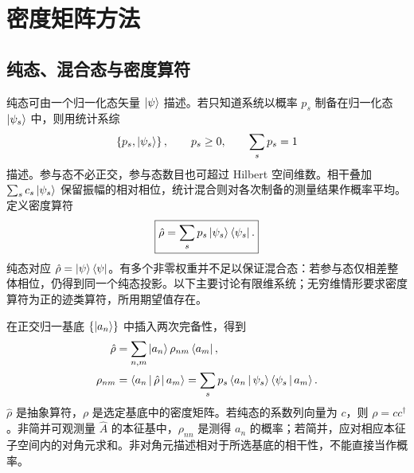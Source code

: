 \section{密度矩阵方法}
\subsection{纯态、混合态与密度算符}
纯态可由一个归一化态矢量 $\Ket{\psi}$ 描述。若只知道系统以概率 $p_s$ 制备在归一化态 $\Ket{\psi_s}$ 中，则用统计系综
\begin{equation}
\left\{p_s,\Ket{\psi_s}\right\},\qquad p_s\geq0,\qquad\sum_s p_s=1
\end{equation}
描述。参与态不必正交，参与态数目也可超过 Hilbert 空间维数。相干叠加 $\sum_s c_s\Ket{\psi_s}$ 保留振幅的相对相位，统计混合则对各次制备的测量结果作概率平均。定义密度算符
\begin{equation}
\boxed{\hat\rho=\sum_s p_s\Ket{\psi_s}\Bra{\psi_s}.}
\label{eq:density-ensemble}
\end{equation}
纯态对应 $\hat\rho=\Ket{\psi}\Bra{\psi}$。有多个非零权重并不足以保证混合态：若参与态仅相差整体相位，仍得到同一个纯态投影。以下主要讨论有限维系统；无穷维情形要求密度算符为正的迹类算符，所用期望值存在。

在正交归一基底 $\left\{\Ket{a_n}\right\}$ 中插入两次完备性，得到
\begin{align}
\hat\rho&=\sum_{n,m}\Ket{a_n}\rho_{nm}\Bra{a_m},\\
\rho_{nm}&=\Braket{a_n|\hat\rho|a_m}
=\sum_s p_s\Braket{a_n|\psi_s}\Braket{\psi_s|a_m}.
\end{align}
$\hat\rho$ 是抽象算符，$\rho$ 是选定基底中的密度矩阵。若纯态的系数列向量为 $c$，则 $\rho=cc^\dagger$。非简并可观测量 $\hat A$ 的本征基中，$\rho_{nn}$ 是测得 $a_n$ 的概率；若简并，应对相应本征子空间内的对角元求和。非对角元描述相对于所选基底的相干性，不能直接当作概率。

